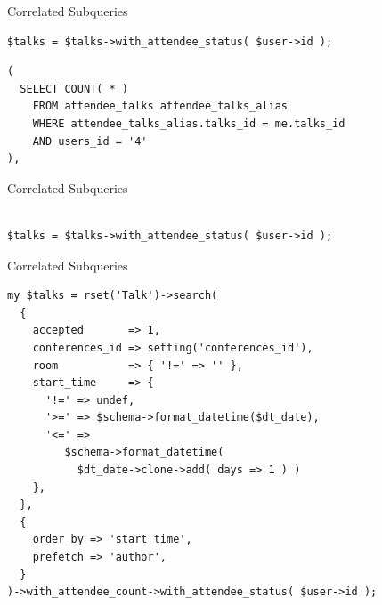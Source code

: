 \begin{frame}[fragile]{Correlated Subqueries}
\begin{lstlisting}
$talks = $talks->with_attendee_status( $user->id );
\end{lstlisting}

\begin{lstlisting}
( 
  SELECT COUNT( * )
    FROM attendee_talks attendee_talks_alias
    WHERE attendee_talks_alias.talks_id = me.talks_id
    AND users_id = '4'
),
\end{lstlisting}
\end{frame}

\begin{frame}[fragile]{Correlated Subqueries}
\begin{lstlisting}
      
$talks = $talks->with_attendee_status( $user->id );

\end{lstlisting}
\end{frame}

\begin{frame}[fragile]{Correlated Subqueries}
\begin{lstlisting}
my $talks = rset('Talk')->search(
  {
    accepted       => 1,
    conferences_id => setting('conferences_id'),
    room           => { '!=' => '' },
    start_time     => {
      '!=' => undef,
      '>=' => $schema->format_datetime($dt_date),
      '<=' =>
         $schema->format_datetime( 
           $dt_date->clone->add( days => 1 ) )
    },
  },
  {
    order_by => 'start_time',
    prefetch => 'author',
  }
)->with_attendee_count->with_attendee_status( $user->id );
\end{lstlisting}
\end{frame}

